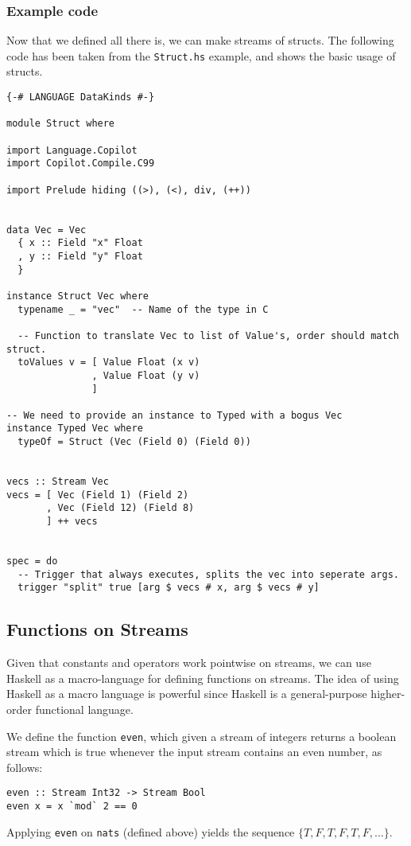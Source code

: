 \subsubsection*{Example code}
\begin{example}
\label{exm:struct}
Now that we defined all there is, we can make streams of structs. The following
code has been taken from the \texttt{Struct.hs} example, and shows the basic
usage of structs.

\begin{lstlisting}[language=Copilot]
{-# LANGUAGE DataKinds #-}

module Struct where

import Language.Copilot
import Copilot.Compile.C99

import Prelude hiding ((>), (<), div, (++))


data Vec = Vec
  { x :: Field "x" Float
  , y :: Field "y" Float
  }

instance Struct Vec where
  typename _ = "vec"  -- Name of the type in C

  -- Function to translate Vec to list of Value's, order should match struct.
  toValues v = [ Value Float (x v)
               , Value Float (y v)
               ]

-- We need to provide an instance to Typed with a bogus Vec
instance Typed Vec where
  typeOf = Struct (Vec (Field 0) (Field 0))


vecs :: Stream Vec
vecs = [ Vec (Field 1) (Field 2)
       , Vec (Field 12) (Field 8)
       ] ++ vecs


spec = do
  -- Trigger that always executes, splits the vec into seperate args.
  trigger "split" true [arg $ vecs # x, arg $ vecs # y]
\end{lstlisting}
\end{example}

\subsection{Functions on Streams} \label{sec:FnOnStreams}

Given that constants and operators work pointwise on streams, we can use Haskell
as a macro-language for defining functions on streams.  The idea of using
Haskell as a macro language is powerful since Haskell is a
general-purpose higher-order functional language.

\begin{example}
We define the function {\tt even}, which given a stream of
integers returns a boolean stream which is true whenever the input stream
contains an even number, as follows:
%
\begin{lstlisting}[language = Copilot, frame = single]
even :: Stream Int32 -> Stream Bool
even x = x `mod` 2 == 0
\end{lstlisting}
%
Applying {\tt even} on {\tt nats} (defined above) yields the sequence
$\{T, F, T, F, T, F, \dots\}$.
\end{example}


